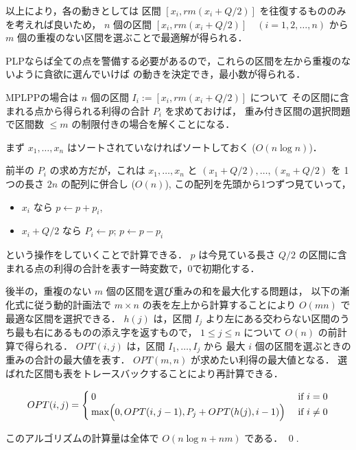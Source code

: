 以上により，各\server の動きとしては
区間 $[x_i, rm(x_i + Q/2)]$ を往復するもののみを考えれば良いため，
$n$ 個の区間 $[x_i, rm(x_i + Q/2)] \quad (i = 1, 2, \ldots, n)$ から
$m$ 個の重複のない区間を選ぶことで最適解が得られる．

PLPならば全ての点を警備する必要があるので，これらの区間を左から重複のないように貪欲に選んでいけば
\server の動きを決定でき，最小\server 数が得られる．

MPLPPの場合は $n$ 個の区間 $I_i := [x_i, rm(x_i + Q/2)]$ について
その区間に含まれる点から得られる利得の合計 $P_i$ を求めておけば，
重み付き区間の選択問題で区間数 $\leq m$ の制限付きの場合を解くことになる．

まず $x_1, \ldots, x_n$ はソートされていなければソートしておく ($O(n \log n)$)．

前半の $P_i$ の求め方だが，これは
$x_1, \ldots, x_n$ と $(x_1 + Q/2), \ldots, (x_n + Q/2)$ を
1つの長さ $2n$ の配列に併合し ($O(n)$), 
この配列を先頭から1つずつ見ていって，
\begin{itemize}
	\item $x_i$ なら $p \gets p + p_i$, 
	\item $x_i + Q/2$ なら $P_i \gets p$; $p \gets p - p_i$
\end{itemize}
という操作をしていくことで計算できる．
$p$ は今見ている長さ $Q/2$ の区間に含まれる点の利得の合計を表す一時変数で，0で初期化する．



後半の，重複のない $m$ 個の区間を選び重みの和を最大化する問題は，
以下の漸化式に従う動的計画法で
$m \times n$ の表を左上から計算することにより $O(mn)$ で
最適な区間を選択できる．
$h(j)$ は，区間 $I_j$ より左にある交わらない区間のうち最も右にあるものの添え字を返すもので，
$1 \leq j \leq n$ について $O(n)$ の前計算で得られる．
$OPT(i,j)$ は，区間 $I_1, \ldots, I_j$ から 最大 $i$ 個の区間を選ぶときの
重みの合計の最大値を表す．
$OPT(m,n)$ が求めたい利得の最大値となる．
選ばれた区間も表をトレースバックすることにより再計算できる．

\begin{equation}
	\label{eq:MPLPPonLine_DP}
	OPT(i,j) = 
	\begin{cases}
	0 & \text{ if } i = 0 \\
	\max \Bigl(
		0,
		OPT(i,j - 1), 
		P_j + OPT(h(j), i - 1)
	\Bigr) & \text{ if } i \neq 0
	\end{cases}
\end{equation}

このアルゴリズムの計算量は全体で $O(n \log n + nm)$ である．
\qed {}.





